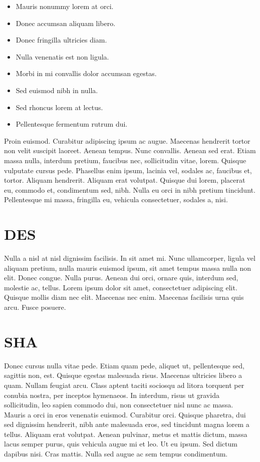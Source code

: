 \documentclass[oneside]{mgr}
\begin{document}
\begin{itemize}
\item Mauris nonummy lorem at orci.
\item Donec accumsan aliquam libero.
\item Donec fringilla ultricies diam.
\item Nulla venenatis est non ligula.
\item Morbi in mi convallis dolor accumsan egestas.
\item Sed euismod nibh in nulla.
\item Sed rhoncus lorem at lectus.
\item Pellentesque fermentum rutrum dui.
\end{itemize}

Proin euismod. Curabitur adipiscing ipsum ac augue. Maecenas hendrerit
tortor non velit suscipit laoreet. Aenean tempus. Nunc
convallis. Aenean sed erat. Etiam massa nulla, interdum pretium,
faucibus nec, sollicitudin vitae, lorem. Quisque vulputate cursus
pede. Phasellus enim ipsum, lacinia vel, sodales ac, faucibus et,
tortor. Aliquam hendrerit. Aliquam erat volutpat. Quisque dui lorem,
placerat eu, commodo et, condimentum sed, nibh. Nulla eu orci in nibh
pretium tincidunt. Pellentesque mi massa, fringilla eu, vehicula
consectetuer, sodales a, nisi.


\chapter{DES}
Nulla a nisl at nisl dignissim facilisis. In sit amet mi. Nunc
ullamcorper, ligula vel aliquam pretium, nulla mauris euismod ipsum,
sit amet tempus massa nulla non elit. Donec congue. Nulla
purus. Aenean dui orci, ornare quis, interdum sed, molestie ac,
tellus. Lorem ipsum dolor sit amet, consectetuer adipiscing
elit. Quisque mollis diam nec elit. Maecenas nec enim. Maecenas
facilisis urna quis arcu. Fusce posuere.


\appendix
\chapter{SHA}
Donec cursus nulla vitae pede. Etiam quam pede, aliquet ut,
pellentesque sed, sagittis non, est. Quisque egestas malesuada
risus. Maecenas ultricies libero a quam. Nullam feugiat arcu. Class
aptent taciti sociosqu ad litora torquent per conubia nostra, per
inceptos hymenaeos. In interdum, risus ut gravida sollicitudin, leo
sapien commodo dui, non consectetuer nisl nunc ac massa. Mauris a orci
in eros venenatis euismod. Curabitur orci. Quisque pharetra, dui sed
dignissim hendrerit, nibh ante malesuada eros, sed tincidunt magna
lorem a tellus. Aliquam erat volutpat. Aenean pulvinar, metus et
mattis dictum, massa lacus semper purus, quis vehicula augue mi et
leo. Ut eu ipsum. Sed dictum dapibus nisi. Cras mattis. Nulla sed
augue ac sem tempus condimentum.
\end{document}
